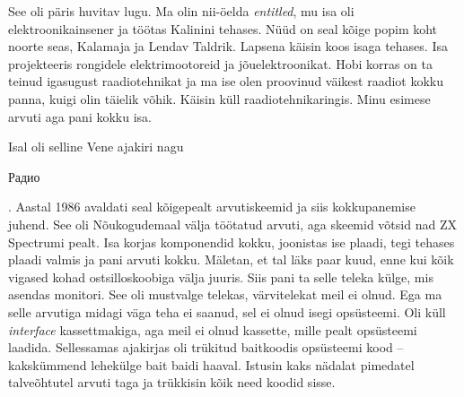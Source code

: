 

See oli päris huvitav lugu. Ma olin nii-öelda \emph{entitled}, mu isa oli
elektroonikainsener ja töötas Kalinini tehases. Nüüd on seal kõige popim koht noorte seas, Kalamaja ja Lendav Taldrik.
Lapsena käisin koos isaga tehases. Isa projekteeris rongidele
elektrimootoreid ja jõuelektroonikat. 
Hobi korras on ta teinud igasugust raadiotehnikat ja ma ise olen proovinud
väikest raadiot kokku panna, kuigi olin täielik võhik. Käisin küll raadiotehnikaringis. Minu esimese arvuti aga pani kokku isa.


Isal oli selline Vene ajakiri nagu 
\begin{russian}Радио\end{russian}. Aastal 1986 avaldati seal 
kõigepealt arvutiskeemid ja siis kokkupanemise juhend. See oli 
Nõukogudemaal välja töötatud arvuti, aga skeemid võtsid nad ZX Spectrumi 
pealt. Isa korjas komponendid kokku, 
joonistas ise plaadi, tegi tehases plaadi valmis ja 
pani arvuti kokku. Mäletan, et tal läks paar kuud, enne kui kõik 
vigased kohad ostsilloskoobiga välja juuris. Siis pani ta selle 
teleka külge, mis asendas monitori. See oli mustvalge telekas, 
värvitelekat meil ei olnud. Ega ma selle arvutiga midagi väga teha ei 
saanud, sel ei olnud isegi opsüsteemi. Oli küll \emph{interface} 
kassettmakiga, aga meil ei olnud kassette, mille pealt 
opsüsteemi laadida. Sellessamas ajakirjas oli trükitud baitkoodis opsüsteemi kood -- 
kakskümmend lehekülge bait baidi haaval. Istusin kaks nädalat pimedatel talveõhtutel arvuti taga 
ja trükkisin kõik need koodid sisse.

